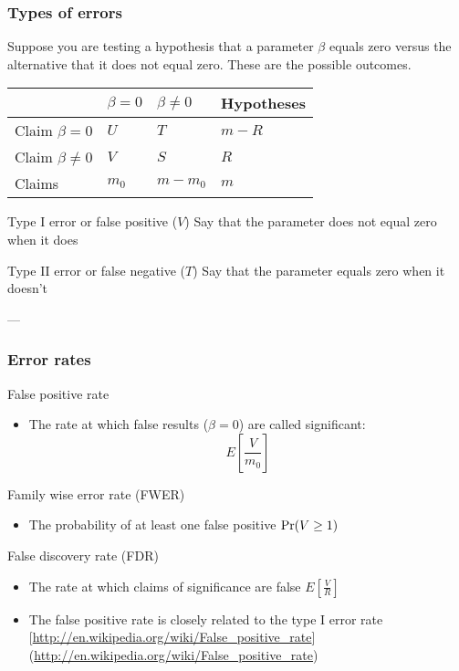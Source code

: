 \documentclass[10pt,article]{article}
\begin{document}
\subsubsection{Types of errors}
\label{sec:org4468ca7}

Suppose you are testing a hypothesis that a parameter \(\beta\) equals zero versus the alternative that it does not equal zero. These are the possible outcomes.

\begin{center}
\begin{tabular}{llll}
 & \(\beta=0\) & \(\beta\neq0\) & Hypotheses\\
\hline
Claim \(\beta=0\) & \(U\) & \(T\) & \(m-R\)\\
Claim \(\beta\neq 0\) & \(V\) & \(S\) & \(R\)\\
Claims & \(m_0\) & \(m-m_0\) & \(m\)\\
\end{tabular}
\end{center}


Type I error or false positive (\(V\)) Say that the parameter does not equal zero when it does

Type II error or false negative (\(T\)) Say that the parameter equals zero when it doesn't


---

\subsubsection{Error rates}
\label{sec:orgf14ec53}

False positive rate
\begin{itemize}
\item The rate at which false results (\(\beta = 0\)) are called significant: $$E\left[\frac{V}{m_0}\right]$$
\end{itemize}

Family wise error rate (FWER)
\begin{itemize}
\item The probability of at least one false positive \({\rm Pr}(V \geq 1)\)
\end{itemize}

False discovery rate (FDR)
\begin{itemize}
\item The rate at which claims of significance are false \(E\left[\frac{V}{R}\right]\)

\item The false positive rate is closely related to the type I error rate [\url{http://en.wikipedia.org/wiki/False\_positive\_rate}](\url{http://en.wikipedia.org/wiki/False\_positive\_rate})
\end{itemize}
\end{document}
